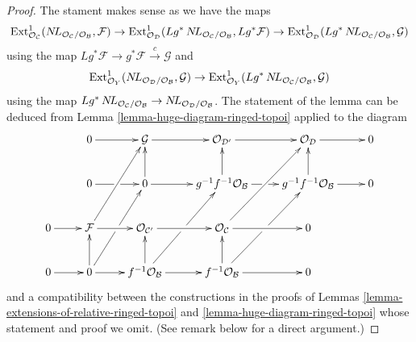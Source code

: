 \begin{proof}
The stament makes sense as we have the maps
$$
\mathop{\mathrm{Ext}}\nolimits^1_{\mathcal{O}_\mathcal{C}}(
\mathop{N\!L}\nolimits_{\mathcal{O}_\mathcal{C}/\mathcal{O}_\mathcal{B}}, \mathcal{F}) \to
\mathop{\mathrm{Ext}}\nolimits^1_{\mathcal{O}_\mathcal{D}}(
Lg^*\mathop{N\!L}\nolimits_{\mathcal{O}_\mathcal{C}/\mathcal{O}_\mathcal{B}}, Lg^*\mathcal{F}) \to
\mathop{\mathrm{Ext}}\nolimits^1_{\mathcal{O}_\mathcal{D}}
(Lg^*\mathop{N\!L}\nolimits_{\mathcal{O}_\mathcal{C}/\mathcal{O}_\mathcal{B}}, \mathcal{G})
$$
using the map $Lg^*\mathcal{F} \to g^*\mathcal{F} \xrightarrow{c} \mathcal{G}$
and
$$
\mathop{\mathrm{Ext}}\nolimits^1_{\mathcal{O}_Y}(
\mathop{N\!L}\nolimits_{\mathcal{O}_\mathcal{D}/\mathcal{O}_\mathcal{B}}, \mathcal{G}) \to
\mathop{\mathrm{Ext}}\nolimits^1_{\mathcal{O}_Y}(
Lg^*\mathop{N\!L}\nolimits_{\mathcal{O}_\mathcal{C}/\mathcal{O}_\mathcal{B}}, \mathcal{G})
$$
using the map $Lg^*\mathop{N\!L}\nolimits_{\mathcal{O}_\mathcal{C}/\mathcal{O}_\mathcal{B}} \to
\mathop{N\!L}\nolimits_{\mathcal{O}_\mathcal{D}/\mathcal{O}_\mathcal{B}}$.
The statement of the lemma can be deduced from
Lemma \ref{lemma-huge-diagram-ringed-topoi} applied to the diagram
$$
\xymatrix{
& 0 \ar[r] &
\mathcal{G} \ar[r] &
\mathcal{O}_{\mathcal{D}'} \ar[r] &
\mathcal{O}_\mathcal{D} \ar[r] & 0 \\
& 0 \ar[r]|\hole & 0 \ar[u] \ar[r] &
g^{-1}f^{-1}\mathcal{O}_\mathcal{B} \ar[u] \ar[r]|\hole &
g^{-1}f^{-1}\mathcal{O}_\mathcal{B} \ar[u] \ar[r] & 0 \\
0 \ar[r] &
\mathcal{F} \ar[ruu] \ar[r] &
\mathcal{O}_{\mathcal{C}'} \ar[r] &
\mathcal{O}_\mathcal{C} \ar[ruu] \ar[r] & 0 \\
0 \ar[r] & 0 \ar[ruu]|\hole \ar[u] \ar[r] &
f^{-1}\mathcal{O}_\mathcal{B} \ar[ruu]|\hole \ar[u] \ar[r] &
f^{-1}\mathcal{O}_\mathcal{B} \ar[ruu]|\hole \ar[u] \ar[r] & 0
}
$$
and a compatibility between the constructions in the proofs
of Lemmas \ref{lemma-extensions-of-relative-ringed-topoi} and
\ref{lemma-huge-diagram-ringed-topoi}
whose statement and proof we omit. (See remark below for a direct argument.)
\end{proof}

